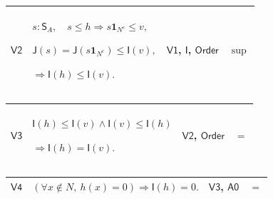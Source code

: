 \documentclass[11pt]{amsart}
\newlength{\FTCFourColumnBody}
\begin{document}
{\begin{tabular}
\end{tabular}%
\par\setlength{\parskip}{0pt}\nointerlineskip
\noindent
\begin{tabular}{|@{}>{\centering\arraybackslash}m{0.078431\FTCFourColumnBody}|>{\centering\arraybackslash}m{0.535947\FTCFourColumnBody}|>{\centering\arraybackslash}m{0.281045\FTCFourColumnBody}|>{\centering\arraybackslash}m{0.104575\FTCFourColumnBody}|}\hline
\hypertarget{dct:V2}{$\displaystyle \textsf{V2}$} & $\displaystyle s:\textsf{S}_A,\quad s\le h\Rightarrow s\mathbf1_{N^c}\le v,$\par
$\displaystyle \textsf{J}(s)=\textsf{J}(s\mathbf1_{N^c})\le\textsf{I}(v),$\par
$\displaystyle \Rightarrow\textsf{I}(h)\le\textsf{I}(v).$ & \hyperlink{dct:V1}{$\displaystyle \textsf{V1}$}, \hyperlink{def:I}{$\displaystyle \textsf{I}$}, \hyperlink{ax:Order}{$\displaystyle \textsf{Order}$} & $\displaystyle \sup$\\ \hline
\end{tabular}%
\par\setlength{\parskip}{0pt}\nointerlineskip
\noindent
\begin{tabular}{|@{}>{\centering\arraybackslash}m{0.078431\FTCFourColumnBody}|>{\centering\arraybackslash}m{0.535947\FTCFourColumnBody}|>{\centering\arraybackslash}m{0.281045\FTCFourColumnBody}|>{\centering\arraybackslash}m{0.104575\FTCFourColumnBody}|}\hline
\hypertarget{dct:V3}{$\displaystyle \textsf{V3}$} & $\displaystyle \textsf{I}(h)\le\textsf{I}(v)\land\textsf{I}(v)\le\textsf{I}(h)$\par
$\displaystyle \Rightarrow\textsf{I}(h)=\textsf{I}(v).$ & \hyperlink{dct:V2}{$\displaystyle \textsf{V2}$}, \hyperlink{ax:Order}{$\displaystyle \textsf{Order}$} & $\displaystyle =$\\ \hline
\end{tabular}%
\par\setlength{\parskip}{0pt}\nointerlineskip
\noindent
\begin{tabular}{|@{}>{\centering\arraybackslash}m{0.078431\FTCFourColumnBody}|>{\centering\arraybackslash}m{0.535947\FTCFourColumnBody}|>{\centering\arraybackslash}m{0.281045\FTCFourColumnBody}|>{\centering\arraybackslash}m{0.104575\FTCFourColumnBody}|}\hline
\hypertarget{dct:V4}{$\displaystyle \textsf{V4}$} & $\displaystyle (\forall x\notin N,\ h(x)=0)\Rightarrow\textsf{I}(h)=0.$ & \hyperlink{dct:V3}{$\displaystyle \textsf{V3}$}, \hyperlink{dct:A0}{$\displaystyle \textsf{A0}$} & $\displaystyle =$\\ \hline
\end{tabular}%
\par
}
\end{document}
